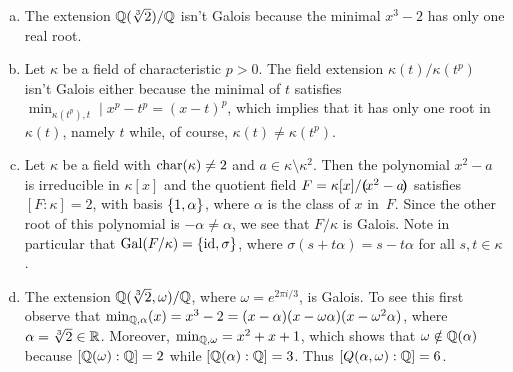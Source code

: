 \begin{xmpls}\label{xmpl:galois-extensions}${}$
    \begin{enumerate}[a), font=\upshape]
        \item The extension $\mathbb{Q}(\sqrt[3]2)/\mathbb{Q}$ isn't Galois because the minimal $x^3-2$ has only one real root.

        \item Let $\kappa$ be a field of characteristic $p>0$. The field extension $\kappa(t)/\kappa(t^p)$ isn't Galois either because the minimal of $t$ satisfies $\min_{\kappa(t^p),t}\mid x^p-t^p=(x-t)^p$, which implies that it has only one root in $\kappa(t)$, namely $t$ while, of course, $\kappa(t)\ne\kappa(t^p)$.

        \item Let $\kappa$ be a field with $\operatorname{char}(\kappa)\ne2$ and $a\in\kappa\setminus\kappa^2$. Then the polynomial $x^2-a$ is irreducible in $\kappa[x]$ and the quotient field $F=\kappa[x]/\textrm{\boldmath$($}\!x^2-a\!\textrm{\boldmath$)$}$ satisfies $[F:\kappa]=2$, with basis $\{1,\alpha\}$, where $\alpha$ is the class of $x$ in~$F$. Since the other root of this polynomial is $-\alpha\ne\alpha$, we see that $F/\kappa$ is Galois. Note in particular that $\operatorname{Gal}(F/\kappa)=\{\operatorname{id},\sigma\}$, where $\sigma(s+t\alpha)=s-t\alpha$ for all $s,t\in\kappa$.

        \item The extension $\mathbb{Q}(\sqrt[3]2,\omega)/\mathbb{Q}$, where $\omega= e^{2\pi i/3}$, is Galois. To see this first observe that $\min_{\mathbb{Q},\alpha}(x)=x^3-2=(x-\alpha)(x-\omega\alpha)(x-\omega^2\alpha)$, where $\alpha=\sqrt[3]2\in\mathbb{R}$. Moreover, $\min_{\mathbb{Q},\omega}=x^2+x+1$, which shows that $\omega\notin\mathbb{Q}(\alpha)$ because $[\mathbb{Q}(\omega):\mathbb{Q}]=2$ while $[\mathbb{Q}(\alpha):\mathbb{Q}]=3$. Thus $[Q(\alpha,\omega):\mathbb{Q}]=6$.


\end{enumerate}
\end{xmpls}
